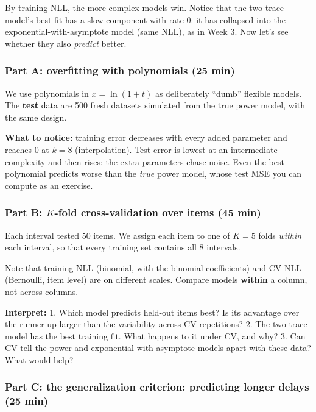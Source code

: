 By training NLL, the more complex models win. Notice that the two-trace
model's best fit has a slow component with rate 0: it has collapsed into
the exponential-with-asymptote model (same NLL), as in Week 3. Now let's
see whether they also \emph{predict} better.

\subsubsection{Part A: overfitting with polynomials (25 min)}

We use polynomials in \(x = \ln(1+t)\) as deliberately ``dumb'' flexible
models. The \textbf{test} data are 500 fresh datasets simulated from the
true power model, with the same design.

\textbf{What to notice:} training error decreases with every added
parameter and reaches 0 at \(k = 8\) (interpolation). Test error is
lowest at an intermediate complexity and then rises: the extra
parameters chase noise. Even the best polynomial predicts worse than the
\emph{true} power model, whose test MSE you can compute as an exercise.

\subsubsection{\texorpdfstring{Part B: \(K\)-fold cross-validation over
items (45 min)}{Part B: K-fold cross-validation over items (45 min)}}

Each interval tested 50 items. We assign each item to one of \(K = 5\)
folds \emph{within} each interval, so that every training set contains
all 8 intervals.

Note that training NLL (binomial, with the binomial coefficients) and
CV-NLL (Bernoulli, item level) are on different scales. Compare models
\textbf{within} a column, not across columns.

\textbf{Interpret:} 1. Which model predicts held-out items best? Is its
advantage over the runner-up larger than the variability across CV
repetitions? 2. The two-trace model has the best training fit. What
happens to it under CV, and why? 3. Can CV tell the power and
exponential-with-asymptote models apart with these data? What would
help?

\subsubsection{Part C: the generalization criterion: predicting longer
delays (25 min)}


